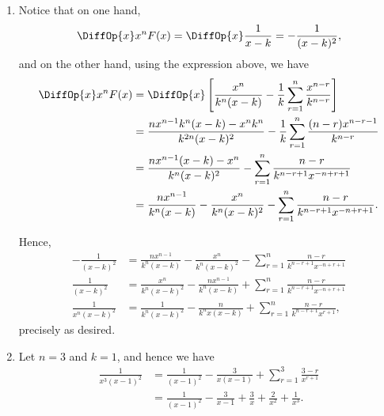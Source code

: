 \begin{enumerate}
    \item Notice that on one hand,
          \[
              \DiffOp{x} x^n F(x) = \DiffOp{x} \frac{1}{x - k} = - \frac{1}{(x - k)^2},
          \]
          and on the other hand, using the expression above, we have
          \begin{align*}
              \DiffOp{x} x^n F(x) & = \DiffOp{x} \left[\frac{x^n}{k^n (x - k)} - \frac{1}{k} \sum_{r = 1}^{n} \frac{x^{n - r}}{k^{n - r}}\right]                        \\
                                  & = \frac{n x^{n - 1} k^n (x - k) - x^n k^n}{k^{2n} (x - k)^2} - \frac{1}{k} \sum_{r = 1}^{n} \frac{(n - r) x^{n - r - 1}}{k^{n - r}} \\
                                  & = \frac{n x^{n - 1} (x - k) - x^n}{k^n (x - k)^2} - \sum_{r = 1}^{n} \frac{n - r}{k^{n - r + 1} x^{-n + r + 1}}                     \\
                                  & = \frac{n x^{n - 1}}{k^n (x - k)} - \frac{x^n}{k^n (x - k)^2} - \sum_{r = 1}^{n} \frac{n - r}{k^{n - r + 1} x^{-n + r + 1}}.
          \end{align*}

          Hence,
          \begin{align*}
              -\frac{1}{(x - k)^2}    & = \frac{n x^{n - 1}}{k^n (x - k)} - \frac{x^n}{k^n (x - k)^2} - \sum_{r = 1}^{n} \frac{n - r}{k^{n - r + 1} x^{-n + r + 1}} \\
              \frac{1}{(x - k)^2}     & = \frac{x^n}{k^n (x - k)^2} - \frac{n x^{n - 1}}{k^n (x - k)} + \sum_{r = 1}^{n} \frac{n - r}{k^{n - r + 1} x^{-n + r + 1}} \\
              \frac{1}{x^n (x - k)^2} & = \frac{1}{k^n (x - k)^2} - \frac{n}{k^n x (x - k)} + \sum_{r = 1}^{n} \frac{n - r}{k^{n - r + 1} x^{r + 1}},
          \end{align*}
          precisely as desired.

    \item Let \(n = 3\) and \(k = 1\), and hence we have
          \begin{align*}
              \frac{1}{x^3 (x - 1)^2} & = \frac{1}{(x - 1)^2} - \frac{3}{x (x - 1)} + \sum_{r = 1}^{3} \frac{3 - r}{x^{r + 1}} \\
                                      & = \frac{1}{(x - 1)^2} - \frac{3}{x - 1} + \frac{3}{x} + \frac{2}{x^2} + \frac{1}{x^3}.
          \end{align*}


\end{enumerate}
